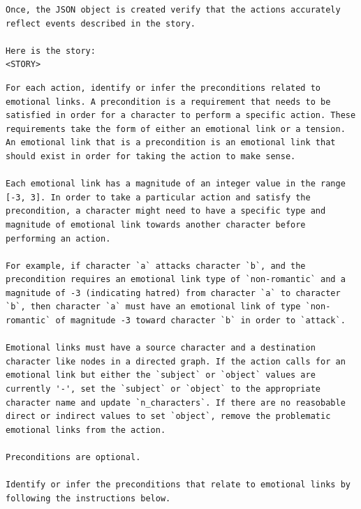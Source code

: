 \documentclass[phd,electronic,oneside,twosidetoc,letterpaper,chaptercenter,parttop,lof]{byumsphd}
\begin{document}
\begin{lstlisting}[style=mypromptstyle, caption={Prompt to extract story actions}, label={lst:story_action_prompt}]
Once, the JSON object is created verify that the actions accurately reflect events described in the story.

Here is the story:
<STORY>
\end{lstlisting}

\begin{lstlisting}[style=mypromptstyle, caption={Emotional preconditions prompt}, label={lst:emotional_preconditions}]
For each action, identify or infer the preconditions related to emotional links. A precondition is a requirement that needs to be satisfied in order for a character to perform a specific action. These requirements take the form of either an emotional link or a tension. An emotional link that is a precondition is an emotional link that should exist in order for taking the action to make sense.

Each emotional link has a magnitude of an integer value in the range [-3, 3]. In order to take a particular action and satisfy the precondition, a character might need to have a specific type and magnitude of emotional link towards another character before performing an action.

For example, if character `a` attacks character `b`, and the precondition requires an emotional link type of `non-romantic` and a magnitude of -3 (indicating hatred) from character `a` to character `b`, then character `a` must have an emotional link of type `non-romantic` of magnitude -3 toward character `b` in order to `attack`. 

Emotional links must have a source character and a destination character like nodes in a directed graph. If the action calls for an emotional link but either the `subject` or `object` values are currently '-', set the `subject` or `object` to the appropriate character name and update `n_characters`. If there are no reasobable direct or indirect values to set `object`, remove the problematic emotional links from the action.

Preconditions are optional.

Identify or infer the preconditions that relate to emotional links by following the instructions below. 


\end{lstlisting}
\end{document}
